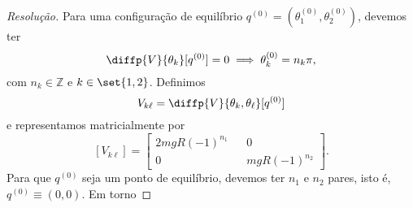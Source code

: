 \begin{proof}[Resolução]
    Para uma configuração de equilíbrio \(q^{(0)} = \left(\theta_1^{(0)}, \theta_2^{(0)}\right)\), devemos ter
    \begin{equation*}
        \diffp{V}{\theta_k}[q^{(0)}] = 0 \implies \theta^{(0)}_k = n_k\pi,
    \end{equation*}
    com \(n_k \in \mathbb{Z}\) e \(k \in \set{1,2}\). Definimos
    \begin{equation*}
        V_{k\ell} = \diffp{V}{\theta_k,\theta_\ell}[q^{(0)}]
    \end{equation*}
    e representamos matricialmente por
    \begin{equation*}
        \left[V_{k\ell}\right] = \begin{bmatrix}
            2mgR(-1)^{n_1} && 0\\
            0 && mgR(-1)^{n_2}
        \end{bmatrix}.
    \end{equation*}
    Para que \(q^{(0)}\) seja um ponto de equilíbrio, devemos ter \(n_1\) e \(n_2\) pares, isto é, \(q^{(0)} \equiv (0,0)\). Em torno
\end{proof}
